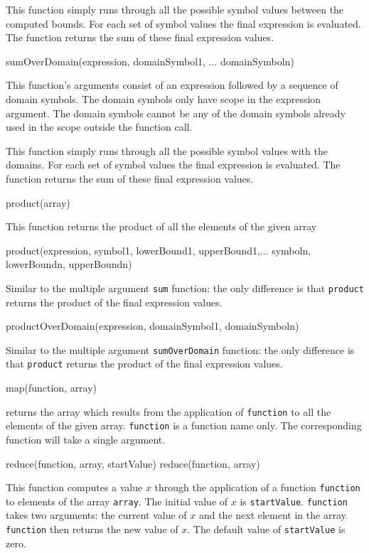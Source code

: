 \documentclass{cekarticle}
\begin{document}
This function simply runs through all the possible symbol values
between the computed bounds.  For each set of symbol values the
final expression is evaluated.  The function returns the sum of
these final expression values.

\begin{example}
sumOverDomain(expression, domainSymbol1, ... domainSymboln)
\end{example}
This function's arguments consist of an expression followed by a
sequence of domain symbols.  The domain symbols only have scope
in the expression argument.  The domain symbols cannot be any of
the domain symbols already used in the scope outside the function
call.

This function simply runs through all the possible symbol values
with the domains.  For each set of symbol values the final
expression is evaluated.  The function returns the sum of these
final expression values.

\begin{example}
product(array)
\end{example}
This function returns the product of all the elements of the
given array

\begin{example}
product(expression, symbol1, lowerBound1, upperBound1,...
    symboln, lowerBoundn, upperBoundn)
\end{example}
Similar to the multiple argument \texttt{sum} function: the only
difference is that \texttt{product} returns the product of the final
expression values.

\begin{example}
productOverDomain(expression, domainSymbol1, domainSymboln)
\end{example}
Similar to the multiple argument \texttt{sumOverDomain} function: the only
difference is that \texttt{product} returns the product of the final
expression values.

\begin{example}
map(function, array)
\end{example}
returns the array which results from the application of
\texttt{function} to all the elements of the given array.
\texttt{function} is a function name only.  The corresponding
function will take a single argument.

\begin{example}
reduce(function, array, startValue)
reduce(function, array)
\end{example}
This function computes a value $x$ through the application of a
function \texttt{function} to elements of the array
\texttt{array}.  The initial value of $x$ is
\texttt{startValue}.  \texttt{function} takes two arguments: the
current value of $x$ and the next element in the array.
\texttt{function} then returns the new value of $x$.
The default value of \texttt{startValue} is zero.
\end{document}
